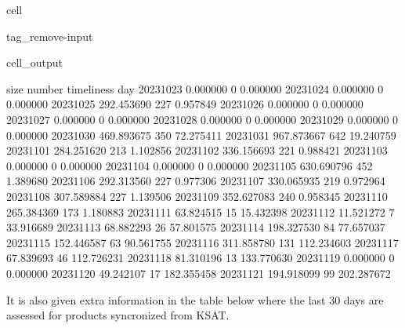 \documentclass[letterpaper,10pt,english]{jupyterBook}
\begin{document}
\begin{sphinxuseclass}{cell}
\begin{sphinxuseclass}{tag_remove-input}\begin{sphinxVerbatimOutput}

\begin{sphinxuseclass}{cell_output}
\begin{sphinxVerbatim}[commandchars=\\\{\}]
                  size  number  timeliness
day                                       
2023\PYGZhy{}10\PYGZhy{}23    0.000000       0    0.000000
2023\PYGZhy{}10\PYGZhy{}24    0.000000       0    0.000000
2023\PYGZhy{}10\PYGZhy{}25  292.453690     227    0.957849
2023\PYGZhy{}10\PYGZhy{}26    0.000000       0    0.000000
2023\PYGZhy{}10\PYGZhy{}27    0.000000       0    0.000000
2023\PYGZhy{}10\PYGZhy{}28    0.000000       0    0.000000
2023\PYGZhy{}10\PYGZhy{}29    0.000000       0    0.000000
2023\PYGZhy{}10\PYGZhy{}30  469.893675     350   72.275411
2023\PYGZhy{}10\PYGZhy{}31  967.873667     642   19.240759
2023\PYGZhy{}11\PYGZhy{}01  284.251620     213    1.102856
2023\PYGZhy{}11\PYGZhy{}02  336.156693     221    0.988421
2023\PYGZhy{}11\PYGZhy{}03    0.000000       0    0.000000
2023\PYGZhy{}11\PYGZhy{}04    0.000000       0    0.000000
2023\PYGZhy{}11\PYGZhy{}05  630.690796     452    1.389680
2023\PYGZhy{}11\PYGZhy{}06  292.313560     227    0.977306
2023\PYGZhy{}11\PYGZhy{}07  330.065935     219    0.972964
2023\PYGZhy{}11\PYGZhy{}08  307.589884     227    1.139506
2023\PYGZhy{}11\PYGZhy{}09  352.627083     240    0.958345
2023\PYGZhy{}11\PYGZhy{}10  265.384369     173    1.180883
2023\PYGZhy{}11\PYGZhy{}11   63.824515      15   15.432398
2023\PYGZhy{}11\PYGZhy{}12   11.521272       7   33.916689
2023\PYGZhy{}11\PYGZhy{}13   68.882293      26   57.801575
2023\PYGZhy{}11\PYGZhy{}14  198.327530      84   77.657037
2023\PYGZhy{}11\PYGZhy{}15  152.446587      63   90.561755
2023\PYGZhy{}11\PYGZhy{}16  311.858780     131  112.234603
2023\PYGZhy{}11\PYGZhy{}17   67.839693      46  112.726231
2023\PYGZhy{}11\PYGZhy{}18   81.310196      13  133.770630
2023\PYGZhy{}11\PYGZhy{}19    0.000000       0    0.000000
2023\PYGZhy{}11\PYGZhy{}20   49.242107      17  182.355458
2023\PYGZhy{}11\PYGZhy{}21  194.918099      99  202.287672
\end{sphinxVerbatim}

\end{sphinxuseclass}\end{sphinxVerbatimOutput}

\end{sphinxuseclass}
\end{sphinxuseclass}
\sphinxAtStartPar
It is also given extra information in the table below where the last 30 days are assessed for products syncronized from KSAT.
\end{document}
